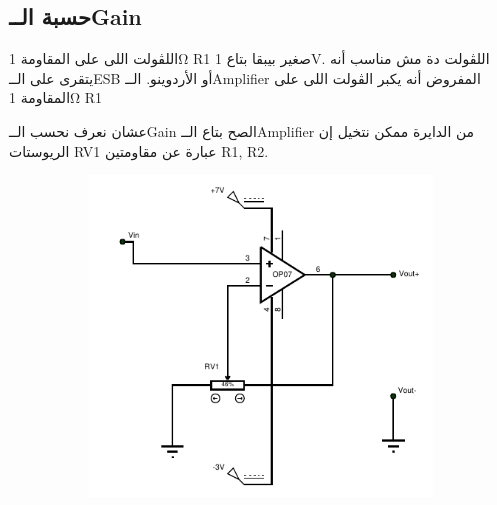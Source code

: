 \documentclass{article}
\begin{document}
\subsection{حسبة الــ\textenglish{Gain}}

اللڤولت اللى على المقاومة \textenglish{1Ω R1} صغير بيبقا بتاع \textenglish{1V}. اللڤولت دة مش مناسب أنه يتقرى على الــ\textenglish{ESB} أو الأردوينو.
الــ\textenglish{Amplifier} المفروض أنه يكبر الڤولت اللى على المقاومة \textenglish{1Ω R1}

عشان نعرف نحسب الــ\textenglish{Gain} الصح بتاع الــ\textenglish{Amplifier} من الدايرة
ممكن نتخيل إن الريوستات \textenglish{RV1} عبارة عن مقاومتين \textenglish{R1, R2}.
\begin{figure}[!ht]
    \centering
    \begin{subfigure}{0.45\linewidth}
        \includegraphics[width=\linewidth]{op amp cut.pdf}
        \caption{}
    \end{subfigure}
    \begin{subfigure}{0.45\linewidth}

\end{subfigure}
\end{figure}
\end{document}
